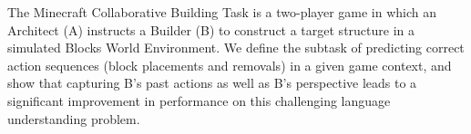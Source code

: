 The Minecraft Collaborative Building Task is a two-player game in which an Architect (A) instructs a Builder (B) to construct a target structure in a simulated Blocks World Environment. We define the subtask of predicting correct action sequences (block placements and removals) in a given game context, and show that capturing B's past actions as well as B's perspective leads to a significant improvement in performance on this challenging language understanding problem.
